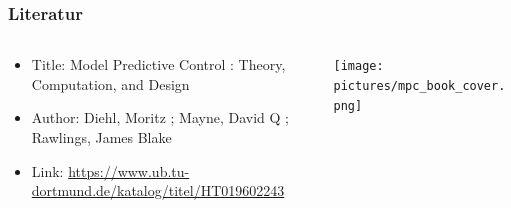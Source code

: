 	\begin{frame}
		\frametitle{Literatur}
		\begin{columns}[T]
			\begin{column}{0.49\textwidth}
				\begin{itemize}%
					\item Title: Model Predictive Control : Theory, Computation, and Design 
					\item Author: Diehl, Moritz ; Mayne, David Q ; Rawlings, James Blake
					\item Link: \href{https://www.ub.tu-dortmund.de/katalog/titel/HT019602243}{https://www.ub.tu-dortmund.de/katalog/titel/HT019602243}
				\end{itemize}
			\end{column}
			\begin{column}{0.49\textwidth}
				\centering
				\texttt{[image: pictures/mpc\_book\_cover.png]}
			\end{column}
		\end{columns}
	\end{frame}

